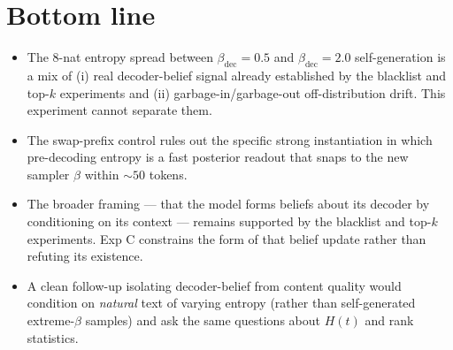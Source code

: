 \documentclass[11pt]{article}
\begin{document}
\section{Bottom line}

\begin{itemize}
\item The 8-nat entropy spread between $\beta_{\mathrm{dec}}=0.5$ and
$\beta_{\mathrm{dec}}=2.0$ self-generation is a mix of (i) real
decoder-belief signal already established by the blacklist and top-$k$
experiments and (ii) garbage-in/garbage-out off-distribution drift.  This
experiment cannot separate them.
\item The swap-prefix control rules out the specific strong instantiation
in which pre-decoding entropy is a fast posterior readout that snaps to
the new sampler $\beta$ within $\sim 50$ tokens.
\item The broader framing --- that the model forms beliefs about its
decoder by conditioning on its context --- remains supported by the
blacklist and top-$k$ experiments.  Exp C constrains the form of that
belief update rather than refuting its existence.
\item A clean follow-up isolating decoder-belief from content quality
would condition on \emph{natural} text of varying entropy (rather than
self-generated extreme-$\beta$ samples) and ask the same questions about
$H(t)$ and rank statistics.
\end{itemize}
\end{document}
